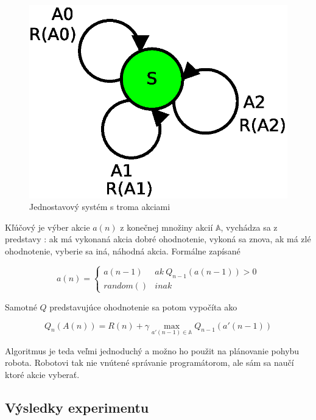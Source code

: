 \begin{figure}[!htb]
\centering
\includegraphics[scale=.6]{../diagrams/single_state.eps}
\caption{Jednostavový systém s troma akciami}
\label{img:single_state_system}
\end{figure}

Kľúčový je výber akcie $a(n)$ z konečnej množiny akcií $\mathbb{A}$,
vychádza sa z predstavy : ak má vykonaná akcia dobré ohodnotenie,
vykoná sa znova, ak má zlé ohodnotenie, vyberie sa iná, náhodná akcia.
Formálne zapísané

\begin{equation}
a(n) =
\left\{
	\begin{array}{ll}
		a(n-1)  & ak \ Q_{n-1}(a(n-1)) > 0 \\
    random() & inak
	\end{array}
\right.
\label{eq:q_nano_action_selection}
\end{equation}

Samotné $Q$ predstavujúce ohodnotenie sa potom vypočíta ako

\begin{equation}
Q_n(A(n)) = R(n) + \gamma  \max_{a'(n-1) \in \mathbb{A}} Q_{n-1}(a'(n-1))
\label{eq:nano_q_func}
\end{equation}

Algoritmus je teda veľmi jednoduchý a možno ho použit na plánovanie pohybu robota.
Robotovi tak nie vnútené správanie programátorom, ale sám sa naučí ktoré akcie
vyberať.


\subsection{Výsledky experimentu}

